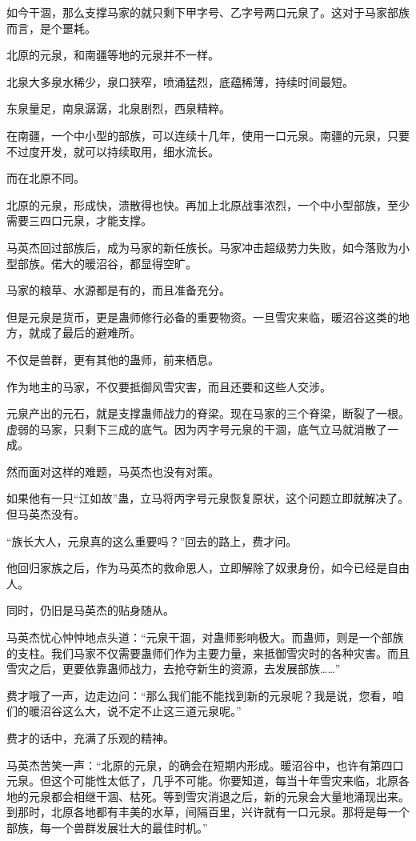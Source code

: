 \begin{this_body}
如今干涸，那么支撑马家的就只剩下甲字号、乙字号两口元泉了。这对于马家部族而言，是个噩耗。

北原的元泉，和南疆等地的元泉并不一样。

北泉大多泉水稀少，泉口狭窄，喷涌猛烈，底蕴稀薄，持续时间最短。

东泉量足，南泉潺潺，北泉剧烈，西泉精粹。

在南疆，一个中小型的部族，可以连续十几年，使用一口元泉。南疆的元泉，只要不过度开发，就可以持续取用，细水流长。

而在北原不同。

北原的元泉，形成快，溃散得也快。再加上北原战事浓烈，一个中小型部族，至少需要三四口元泉，才能支撑。

马英杰回过部族后，成为马家的新任族长。马家冲击超级势力失败，如今落败为小型部族。偌大的暖沼谷，都显得空旷。

马家的粮草、水源都是有的，而且准备充分。

但是元泉是货币，更是蛊师修行必备的重要物资。一旦雪灾来临，暖沼谷这类的地方，就成了最后的避难所。

不仅是兽群，更有其他的蛊师，前来栖息。

作为地主的马家，不仅要抵御风雪灾害，而且还要和这些人交涉。

元泉产出的元石，就是支撑蛊师战力的脊梁。现在马家的三个脊梁，断裂了一根。虚弱的马家，只剩下三成的底气。因为丙字号元泉的干涸，底气立马就消散了一成。

然而面对这样的难题，马英杰也没有对策。

如果他有一只“江如故”蛊，立马将丙字号元泉恢复原状，这个问题立即就解决了。但马英杰没有。

“族长大人，元泉真的这么重要吗？”回去的路上，费才问。

他回归家族之后，作为马英杰的救命恩人，立即解除了奴隶身份，如今已经是自由人。

同时，仍旧是马英杰的贴身随从。

马英杰忧心忡忡地点头道：“元泉干涸，对蛊师影响极大。而蛊师，则是一个部族的支柱。我们马家不仅需要蛊师们作为主要力量，来抵御雪灾时的各种灾害。而且雪灾之后，更要依靠蛊师战力，去抢夺新生的资源，去发展部族……”

费才哦了一声，边走边问：“那么我们能不能找到新的元泉呢？我是说，您看，咱们的暖沼谷这么大，说不定不止这三道元泉呢。”

费才的话中，充满了乐观的精神。

马英杰苦笑一声：“北原的元泉，的确会在短期内形成。暖沼谷中，也许有第四口元泉。但这个可能性太低了，几乎不可能。你要知道，每当十年雪灾来临，北原各地的元泉都会相继干涸、枯死。等到雪灾消退之后，新的元泉会大量地涌现出来。到那时，北原各地都有丰美的水草，间隔百里，兴许就有一口元泉。那将是每一个部族，每一个兽群发展壮大的最佳时机。”


\end{this_body}
